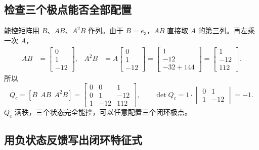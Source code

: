 \subsection{检查三个极点能否全部配置}

能控矩阵用 $B$、$AB$、$A^2B$ 作列。由于 $B=e_3$，$AB$ 直接取 $A$ 的第三列。再左乘一次 $A$，
\[
\begin{aligned}
    AB&=\begin{bmatrix}0\\1\\-12\end{bmatrix},&
    A^2B&=A\begin{bmatrix}0\\1\\-12\end{bmatrix}
         =\begin{bmatrix}1\\-12\\-32+144\end{bmatrix}
         =\begin{bmatrix}1\\-12\\112\end{bmatrix}.
\end{aligned}
\]
所以
\[
    Q_c=[B\ \ AB\ \ A^2B]
      =\begin{bmatrix}0&0&1\\0&1&-12\\1&-12&112\end{bmatrix},
    \qquad
    \det Q_c
      =1\cdot\begin{vmatrix}0&1\\1&-12\end{vmatrix}=-1 .
\]
$Q_c$ 满秩，三个状态完全能控，可以任意配置三个闭环极点。

\subsection{用负状态反馈写出闭环特征式}


